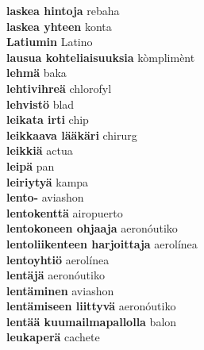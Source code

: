 \textbf{ laskea hintoja  } rebaha \\
\textbf{ laskea yhteen  } konta \\
\textbf{ Latiumin  } Latino \\
\textbf{ lausua kohteliaisuuksia  } kòmplimènt \\
\textbf{ lehmä  } baka \\
\textbf{ lehtivihreä  } chlorofyl \\
\textbf{ lehvistö  } blad \\
\textbf{ leikata irti  } chip \\
\textbf{ leikkaava lääkäri  } chirurg \\
\textbf{ leikkiä  } actua \\
\textbf{ leipä  } pan \\
\textbf{ leiriytyä  } kampa \\
\textbf{ lento-  } aviashon \\
\textbf{ lentokenttä  } airopuerto \\
\textbf{ lentokoneen ohjaaja  } aeronóutiko \\
\textbf{ lentoliikenteen harjoittaja  } aerolínea \\
\textbf{ lentoyhtiö  } aerolínea \\
\textbf{ lentäjä  } aeronóutiko \\
\textbf{ lentäminen  } aviashon \\
\textbf{ lentämiseen liittyvä  } aeronóutiko \\
\textbf{ lentää kuumailmapallolla  } balon \\
\textbf{ leukaperä  } cachete \\
